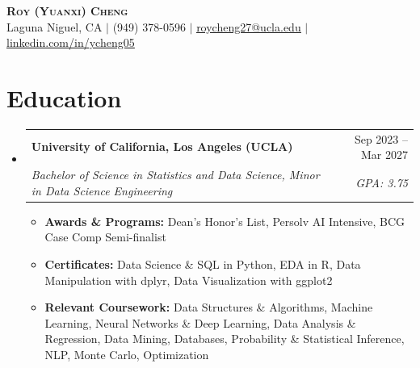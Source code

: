 \documentclass[letterpaper,11pt]{article}
\makeatletter
\newcommand{\resumeItem}[1]{
  \item\small{#1}
}
\newcommand{\resumeSubheading}[4]{
  \vspace{-2pt}\item
    \begin{tabular*}{\textwidth}[t]{l@{\extracolsep{\fill}}r}
      \textbf{#1} & #2 \\
      \textit{\small#3} & \textit{\small #4} \\
    \end{tabular*}\vspace{-7pt}
}
\newcommand{\resumeSubHeadingListStart}{\begin{itemize}[leftmargin=0in, label={}]}
\newcommand{\resumeSubHeadingListEnd}{\end{itemize}}
\newcommand{\resumeItemListStart}{\begin{itemize}[itemsep= 1.5pt, parsep=0pt]}
\newcommand{\resumeItemListEnd}{\end{itemize}\vspace{-5pt}}
\makeatother
\begin{document}
\begin{center}
    \textbf{\LARGE \scshape Roy (Yuanxi) Cheng} \\ \vspace{3pt}
    \small Laguna Niguel, CA $|$ (949) 378-0596 $|$
    \href{mailto:roycheng27@ucla.edu}{\underline{roycheng27@ucla.edu}} $|$
    \href{https://www.linkedin.com/in/ycheng05}{\underline{linkedin.com/in/ycheng05}}
\end{center}
\section{Education}
  \resumeSubHeadingListStart
    \resumeSubheading
      {University of California, Los Angeles (UCLA)}{Sep 2023 -- Mar 2027}
      {Bachelor of Science in Statistics and Data Science, Minor in Data Science Engineering}{GPA: 3.75}
      \resumeItemListStart
        \resumeItem{\textbf{Awards \& Programs:} Dean's Honor's List, Persolv AI Intensive, BCG Case Comp Semi-finalist}
        \resumeItem{\textbf{Certificates:} Data Science \& SQL in Python, EDA in R, Data Manipulation with dplyr, Data Visualization with ggplot2}
        \resumeItem{\textbf{Relevant Coursework:} Data Structures \& Algorithms, Machine Learning, Neural Networks \& Deep Learning, Data Analysis \& Regression, Data Mining, Databases, Probability \& Statistical Inference, NLP, Monte Carlo, Optimization}
      \resumeItemListEnd
  \resumeSubHeadingListEnd
\end{document}
